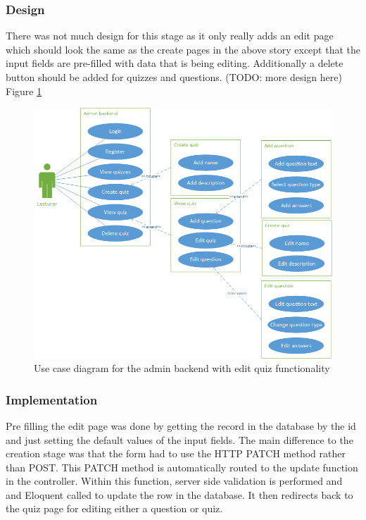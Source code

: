 \subsubsection{Design}
There was not much design for this stage as it only really adds an edit page which should look the same as the create pages in the above story except that the input fields are pre-filled with data that is being editing. Additionally a delete button should be added for quizzes and questions. (TODO: more design here) Figure \ref{fig:quiz-edit-use-case}
\begin{figure}
	\caption{Use case diagram for the admin backend with edit quiz functionality}
	\centerline{\includegraphics{Chapter2/Iter-2/iter-2-use-case-edit}}
	\label{fig:quiz-edit-use-case}
\end{figure}
\subsubsection{Implementation}
Pre filling the edit page was done by getting the record in the database by the id and just setting the default values of the input fields. The main difference to the creation stage was that the form had to use the HTTP PATCH method rather than POST. This PATCH method is automatically routed to the update function in the controller\cite{laravel-resource-controller}. Within this function, server side validation is performed and and Eloquent called to update the row in the database. It then redirects back to the quiz page for editing either a question or quiz.


